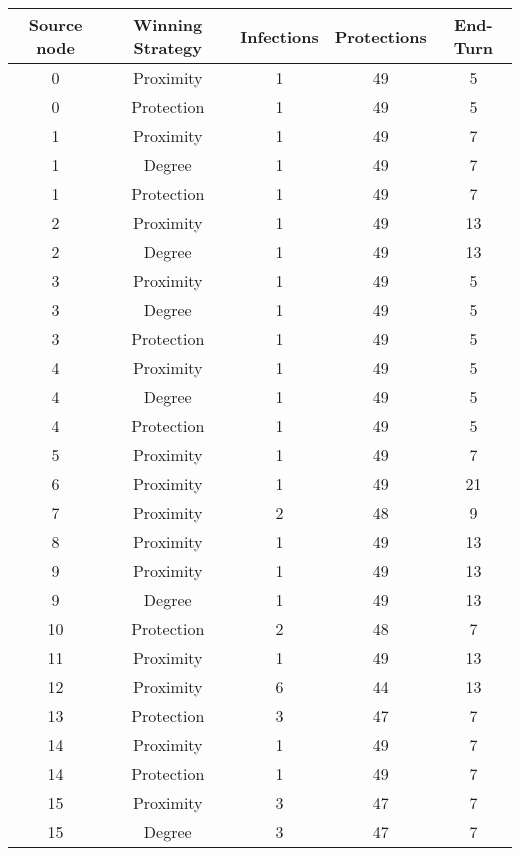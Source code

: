 \documentclass[results.tex]{subfiles}
\begin{document}
\begin{center}
  \begin{tabular}{| c || c | c | c | c |}
    \hline
    {\bfseries Source node} & {\bfseries Winning Strategy} & {\bfseries Infections} & {\bfseries Protections} & {\bfseries End-Turn} \\  %
    \hline\hline
    0 & Proximity & 1 & 49 & 5 \\ 
    \hline
    0 & Protection & 1 & 49 & 5 \\ 
    \hline
    1 & Proximity & 1 & 49 & 7 \\ 
    \hline
    1 & Degree & 1 & 49 & 7 \\ 
    \hline
    1 & Protection & 1 & 49 & 7 \\ 
    \hline
    2 & Proximity & 1 & 49 & 13 \\ 
    \hline
    2 & Degree & 1 & 49 & 13 \\ 
    \hline
    3 & Proximity & 1 & 49 & 5 \\ 
    \hline
    3 & Degree & 1 & 49 & 5 \\ 
    \hline
    3 & Protection & 1 & 49 & 5 \\ 
    \hline
    4 & Proximity & 1 & 49 & 5 \\ 
    \hline
    4 & Degree & 1 & 49 & 5 \\ 
    \hline
    4 & Protection & 1 & 49 & 5 \\ 
    \hline
    5 & Proximity & 1 & 49 & 7 \\ 
    \hline
    6 & Proximity & 1 & 49 & 21 \\ 
    \hline
    7 & Proximity & 2 & 48 & 9 \\ 
    \hline
    8 & Proximity & 1 & 49 & 13 \\ 
    \hline
    9 & Proximity & 1 & 49 & 13 \\ 
    \hline
    9 & Degree & 1 & 49 & 13 \\ 
    \hline
    10 & Protection & 2 & 48 & 7 \\ 
    \hline
    11 & Proximity & 1 & 49 & 13 \\ 
    \hline
    12 & Proximity & 6 & 44 & 13 \\ 
    \hline
    13 & Protection & 3 & 47 & 7 \\ 
    \hline
    14 & Proximity & 1 & 49 & 7 \\ 
    \hline
    14 & Protection & 1 & 49 & 7 \\ 
    \hline
    15 & Proximity & 3 & 47 & 7 \\ 
    \hline
    15 & Degree & 3 & 47 & 7 \\ 

\end{tabular}
\end{center}
\end{document}
